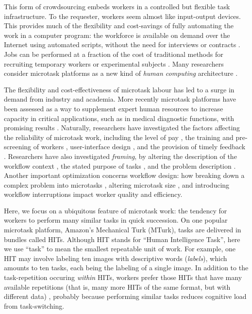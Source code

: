 \documentclass[12pt]{article}
\begin{document}
This form of crowdsourcing embeds workers in a controlled but flexible
task infrastructure.  To the requester, workers seem almost like input-output 
devices.  
This provides much of the flexibility and 
cost-savings of fully automating the work in a computer program: 
the workforce is available on demand over the Internet using automated 
scripts, without the need for interviews or contracts 
\cite{wolfson2011look,5543192}.
Jobs can be performed at a fraction of the cost of traditional methods for 
recruiting temporary workers or experimental subjects
\cite{Berinsky2012351}. %
Many researchers consider microtask platforms 
as a new kind of \textit{human computing} architecture
\cite{5543192}. %

The flexibility and cost-effectiveness of microtask labour
has led to a surge in demand from industry and 
academia\cite{wolfson2011look,Berinsky2012351}.  More recently microtask 
platforms have
been assessed as a way to supplement expert human resources to increase
capacity in critical applications, such as in medical diagnostic functions,
with promising results \cite{Warby2014385}.
Naturally, researchers have investigated the factors affecting the reliability
of microtask work, including
the level of pay \cite{Mason200977,kazai2013analysis}, 
the training and pre-screening of workers 
\cite{le2010ensuring,kazai2013analysis}, %
user-interface design \cite{Finnerty2013}, and the provision of timely 
feedback \cite{Dow20121013}.
Researchers have also investigated \textit{framing}, 
by altering the description of the workflow context 
\cite{Kinnaird2012281}, the stated purpose of tasks 
\cite{chandler2013breaking}, and the problem description
\cite{thibodeau2013natural}.  Another important optimization concerns
workflow design: how breaking down a complex problem into microtasks
\cite{kittur2011crowdforge}, altering microtask size 
\cite{Huang201077}, and introducing workflow interruptions 
\cite{laseckieffects} impact worker quality and efficiency.

Here, we focus on a ubiquitous feature of microtask work: the tendency
for workers to perform many similar tasks in quick succession.  
On one popular microtask platform, Amazon's Mechanical Turk (MTurk), 
tasks are delivered in bundles called HITs.
Although HIT stands for ``Human Intelligence Task'', here we use ``task'' to 
mean the smallest repeatable unit of work.  For example, one HIT may involve 
labeling ten images with descriptive words (\textit{labels}), which amounts
to ten tasks, each being the labeling of a single image.
In addition to the task-repetition occuring \textit{within} HITs, 
workers prefer those HITs that have many available repetitions (that is,
many more HITs of the same format, but with different data) 
\cite{Chilton20101}, probably because performing similar tasks reduces 
cognitive load from task-switching\cite{Adamczyk2004271}.
\end{document}
